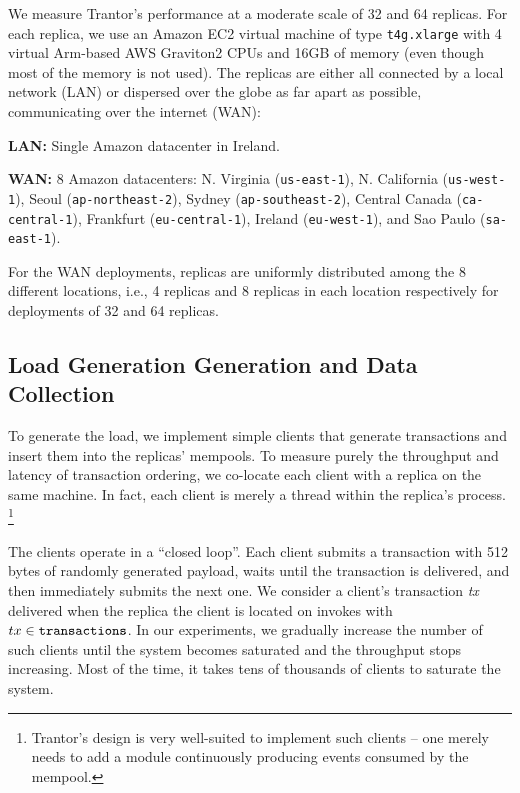 \documentclass{article}
\begin{document}
We measure Trantor's performance at a moderate scale of 32 and 64 replicas.
For each replica, we use an Amazon EC2 virtual machine of type \texttt{t4g.xlarge}
with 4 virtual Arm-based AWS Graviton2 CPUs and 16GB of memory (even though most of the memory is not used).
The replicas are either all connected by a local network (LAN) or dispersed over the globe as far apart as possible, communicating over the internet (WAN):
\begin{compactitem}
    \item \textbf{LAN:} Single Amazon datacenter in Ireland.
    \item \textbf{WAN:} 8 Amazon datacenters:
    N. Virginia (\texttt{us-east-1}),
    N. California (\texttt{us-west-1}),
    Seoul (\texttt{ap-northeast-2}),
    Sydney (\texttt{ap-southeast-2}),
    Central Canada (\texttt{ca-central-1}),
    Frankfurt (\texttt{eu-central-1}),
    Ireland (\texttt{eu-west-1}),
    and Sao Paulo (\texttt{sa-east-1}).
\end{compactitem}
For the WAN deployments, replicas are uniformly distributed among the 8 different locations,
i.e., 4 replicas and 8 replicas in each location respectively for deployments of 32 and 64 replicas.

\subsection{Load Generation Generation and Data Collection}

To generate the load, we implement simple clients that generate transactions and insert them into the replicas' mempools.
To measure purely the throughput and latency of transaction ordering, we co-locate each client with a replica on the same machine.
In fact, each client is merely a thread within the replica's process.%
\footnote{Trantor's design is very well-suited to implement such clients --
one merely needs to add a module continuously producing  events consumed by the mempool.}

The clients operate in a “closed loop”.
Each client submits a transaction with 512 bytes of randomly generated payload, waits until the transaction is delivered, and then immediately submits the next one.
We consider a client's transaction \textit{tx} delivered when the replica the client is located on invokes  with $tx \in \texttt{transactions}$.
In our experiments, we gradually increase the number of such clients until the system becomes saturated and the throughput stops increasing.
Most of the time, it takes tens of thousands of clients to saturate the system.
\end{document}
